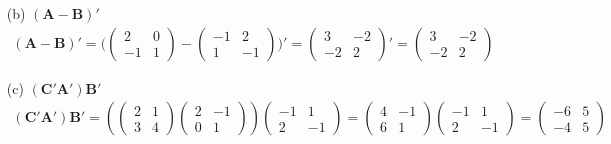 \documentclass{article}
\begin{document}
\begin{enumerate}
\begin{enumerate}
            \item[(b)] $(\mathbf{A} - \mathbf{B})'$
            \begin{align*}
                (\mathbf{A} - \mathbf{B})' 
                =  \Bigg( \begin{pmatrix}2 &0\\-1 &1\end{pmatrix} 
                - \begin{pmatrix}-1 &2\\1 &-1\end{pmatrix} \Bigg)'
                = \begin{pmatrix}3 &-2\\-2 &2\end{pmatrix}'
                = \begin{pmatrix}3 &-2\\-2 &2\end{pmatrix}
            \end{align*}
            
            \item[(c)] $(\mathbf{C}'\mathbf{A}')\mathbf{B}'$
            \begin{align*}
                (\mathbf{C}'\mathbf{A}')\mathbf{B}'
                = \left( \begin{pmatrix}2 &1\\3 &4\end{pmatrix} 
                  \begin{pmatrix}2 &-1\\0 &1\end{pmatrix} \right)
                  \begin{pmatrix}-1 &1\\2 &-1\end{pmatrix}
                = \begin{pmatrix}4 &-1\\6 &1\end{pmatrix}
                  \begin{pmatrix}-1 &1\\2 &-1\end{pmatrix}
                = \begin{pmatrix}-6 &5\\-4 &5\end{pmatrix}
            \end{align*}
            

\end{enumerate}
\end{enumerate}
\end{document}
